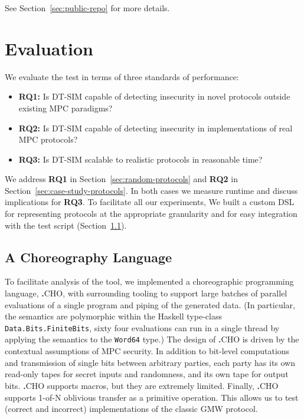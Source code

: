 \documentclass[compsoc, conference, a4paper, 10pt, times]{IEEEtran}
\newcommand{\langname}{\textsc{\textbf{.}CHO}\xspace}
\newcommand{\toolname}{\textsc{DT-SIM}\xspace}
\begin{document}
See Section~\ref{sec:public-repo} for more details.



\section{Evaluation}

We evaluate the test in terms of three standards of performance:
\begin{itemize}
\item \textbf{RQ1:} Is \toolname capable of detecting insecurity in novel protocols outside existing MPC paradigms?
\item \textbf{RQ2:} Is \toolname capable of detecting insecurity in implementations of real MPC protocols?
\item \textbf{RQ3:} Is \toolname scalable to realistic protocols in reasonable time?
\end{itemize}
We address \textbf{RQ1} in Section~\ref{sec:random-protocols}
and \textbf{RQ2} in Section~\ref{sec:case-study-protocols}.
In both cases we measure runtime and discuss implications for \textbf{RQ3}.
To facilitate all our experiments,
We built a custom DSL for representing protocols at the appropriate granularity and for easy integration with the test script
(Section~\ref{sec:cho-lang}).


\subsection{A Choreography Language}
\label{sec:cho-lang}

To facilitate analysis of the tool, we implemented a choreographic programming language, \langname,
with surrounding tooling to support large batches of parallel evaluations of a single program and piping of the generated data.
(In particular, the semantics are polymorphic within the Haskell type-class \texttt{Data.Bits.FiniteBits},
\eg{} sixty four evaluations can run in a single thread by applying the semantics to the \texttt{Word64} type.)
The design of \langname is driven by the contextual assumptions of MPC security.
In addition to bit-level computations and transmission of single bits between arbitrary parties,
each party has its own read-only tapes for secret inputs and randomness,
and its own tape for output bits.
\langname supports macros, but they are extremely limited.
Finally, \langname supports 1-of-N oblivious transfer as a primitive operation.
This allows us to test (correct and incorrect) implementations of the classic GMW protocol.
\end{document}
